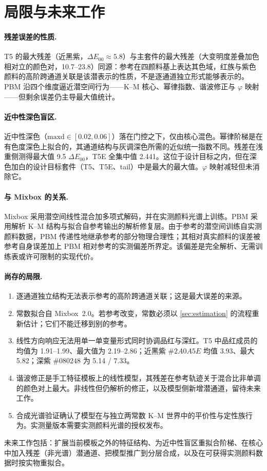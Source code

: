 \section{局限与未来工作}
\label{sec:limitations}

\paragraph{残差误差的性质.}
T5 的最大残差（近黑紫，$\Delta E_{00}\approx5.8$）与主套件的最大残差（大变明度差叠加色相对立的颜色对，10.7--23.8）同源：参考在四颜料基上表达其色域，红族与紫色颜料的高阶跨通道关联是该潜表示的性质，不是逐通道独立形式能够表示的。PBM 沿四个维度逼近潜空间行为——K--M 核心、幂律指数、谐波修正与 $\varphi$ 映射——但剩余误差仍主导最大值统计。

\paragraph{近中性深色盲区.}
近中性深色（$\mathrm{maxd}\in[0.02,0.06]$）落在门控之下，仅由核心混色。幂律阶梯是在有色度深色上拟合的，其通道结构与灰调深色所需的近似统一指数不同。残差在浅重侧测得最大值 9.5 $\Delta E_{00}$，T5E 全集中值 2.441。这位于设计目标之内，但在深色加白的设计目标套件（T5、T5E、tail）中是最大的最大值。$\varphi$ 映射减轻但未消除它。

\paragraph{与 Mixbox 的关系.}
Mixbox 采用潜空间线性混合加多项式解码，并在实测颜料光谱上训练。PBM 采用解析 K--M 结构与拟合自参考输出的解析修复层。由于参考的潜空间训练自实测颜料数据，PBM 传递性地继承参考的部分物理合理性；其相对真实颜料的误差被参考自身误差加上 PBM 相对参考的实测偏差所界定。该偏差是完全解析、无需训练表或许可限制的实现代价。

\paragraph{尚存的局限.}
\begin{enumerate}
\item 逐通道独立结构无法表示参考的高阶跨通道关联；这是最大误差的来源。
\item 常数拟合自 Mixbox~2.0。若参考改变，常数必须以 \cref{sec:estimation} 的流程重新估计；它们不能迁移到别的参考。
\item 线性方向响应无法用单一单变量形式同时协调品红与深红。T5 中品红成员的均值为 1.91--1.99、最大值为 2.19--2.86；近黑紫 $\#2A0A5E$ 均值 3.93、最大 5.82；深紫 $\#080248$ 为 5.14 / 7.33。
\item 谐波修正是手工特征模板上的线性模型，其残差在参考轨迹关于混合比非单调的颜色对上最大。非线性但仍解析的修正，以及模型侧新增潜通道，留待未来工作。
\item 合成光谱验证确认了模型在与独立两常数 K--M 世界中的平价性与定性族行为。实测量版本需要实测颜料光谱的授权发布。
\end{enumerate}

未来工作包括：扩展当前模板之外的特征结构、为近中性盲区重拟合阶梯、在核心中加入残差（非光谱）潜通道、把模型推广到分层合成，以及在可获得实测颜料数据时按实物重拟合。
